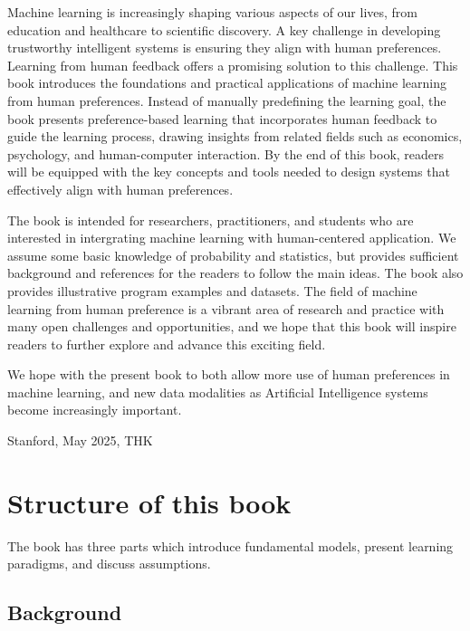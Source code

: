 \documentclass[
  letterpaper,
  numbers=noenddot,
  DIV=11]{scrreprt}
\theoremstyle{plain}
\theoremstyle{definition}
\theoremstyle{remark}
\begin{document}

Machine learning is increasingly shaping various aspects of our lives,
from education and healthcare to scientific discovery. A key challenge
in developing trustworthy intelligent systems is ensuring they align
with human preferences. Learning from human feedback offers a promising
solution to this challenge. This book introduces the foundations and
practical applications of machine learning from human preferences.
Instead of manually predefining the learning goal, the book presents
preference-based learning that incorporates human feedback to guide the
learning process, drawing insights from related fields such as
economics, psychology, and human-computer interaction. By the end of
this book, readers will be equipped with the key concepts and tools
needed to design systems that effectively align with human preferences.

The book is intended for researchers, practitioners, and students who
are interested in intergrating machine learning with human-centered
application. We assume some basic knowledge of probability and
statistics, but provides sufficient background and references for the
readers to follow the main ideas. The book also provides illustrative
program examples and datasets. The field of machine learning from human
preference is a vibrant area of research and practice with many open
challenges and opportunities, and we hope that this book will inspire
readers to further explore and advance this exciting field.

We hope with the present book to both allow more use of human
preferences in machine learning, and new data modalities as Artificial
Intelligence systems become increasingly important.

Stanford, May 2025, THK

\section*{Structure of this book}\label{structure-of-this-book}


The book has three parts which introduce fundamental models, present
learning paradigms, and discuss assumptions.

\subsection*{Background}\label{background}
\end{document}
